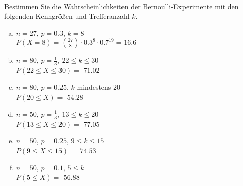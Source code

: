 \begin{aufgabe} ~ \\ 
Bestimmen Sie die Wahrscheinlichkeiten der Bernoulli-Experimente mit den folgenden Kenngrößen und Trefferanzahl $k$.\begin{multicols}{2} 
\begin{enumerate}[a)] 
\item 
$n=27$, $p=0.3$, $k=8$\\ 
$P(X=8)=\binom{27}{8}\cdot0.3^{8}\cdot0.7^{19}=16.6$
\item 
$n=80$, $p=\frac{1}{3}$, $22\leq k \leq 30$\\ 
$P(22\leq X \leq 30)=$ $71.02$
\item 
$n=80$, $p=0.25$, $k$ mindestens $20$\\ 
$P(20\leq X)=$ $54.28$
\item 
$n=50$, $p=\frac{1}{3}$, $13\leq k \leq 20$\\ 
$P(13\leq X \leq 20)=$ $77.05$
\item 
$n=50$, $p=0.25$, $9\leq k \leq 15$\\ 
$P(9\leq X \leq 15)=$ $74.53$
\item 
$n=50$, $p=0.1$, $5\leq k $\\ 
$P(5\leq X)=$ $56.88$
\end{enumerate} 
\end{multicols} 
\end{aufgabe} 
